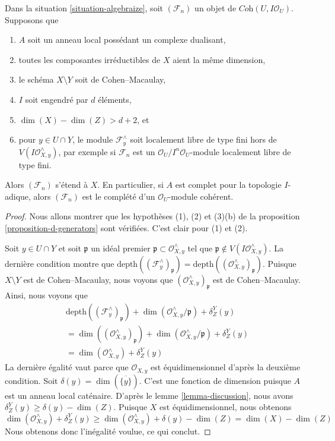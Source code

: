 \begin{lemma}
\label{lemma-interesting-case-final}
Dans la situation \ref{situation-algebraize}, soit $(\mathcal{F}_n)$
un objet de $\textit{Coh}(U, I\mathcal{O}_U)$. Supposons que
\begin{enumerate}
\item $A$ soit un anneau local possédant un complexe dualisant,
\item toutes les composantes irréductibles de $X$ aient la même dimension,
\item le schéma $X \setminus Y$ soit de Cohen--Macaulay,
\item $I$ soit engendré par $d$ éléments,
\item $\dim(X) - \dim(Z) > d + 2$, et
\item pour $y \in U \cap Y$, le module $\mathcal{F}_y^\wedge$
soit localement libre de type fini hors de $V(I\mathcal{O}_{X, y}^\wedge)$,
par exemple si $\mathcal{F}_n$ est un
$\mathcal{O}_U/I^n\mathcal{O}_U$-module localement libre de type fini.
\end{enumerate}
Alors $(\mathcal{F}_n)$ s'étend à $X$. En particulier, si $A$ est complet pour la topologie $I$-adique,
alors $(\mathcal{F}_n)$ est le complété d'un
$\mathcal{O}_U$-module cohérent.
\end{lemma}

\begin{proof}
Nous allons montrer que les hypothèses (1), (2) et (3)(b) de la
proposition \ref{proposition-d-generators} sont vérifiées.
C'est clair pour (1) et (2).

\medskip\noindent
Soit $y \in U \cap Y$ et soit $\mathfrak p$ un idéal premier
$\mathfrak p \subset \mathcal{O}_{X, y}^\wedge$ tel que
$\mathfrak p \not \in V(I\mathcal{O}_{X, y}^\wedge)$.
La dernière condition montre que
$\text{depth}((\mathcal{F}_y^\wedge)_\mathfrak p) =
\text{depth}((\mathcal{O}_{X, y}^\wedge)_\mathfrak p)$.
Puisque $X \setminus Y$ est de Cohen--Macaulay, nous voyons que
$(\mathcal{O}_{X, y}^\wedge)_\mathfrak p$ est de Cohen--Macaulay.
Ainsi, nous voyons que
\begin{align*}
& \text{depth}((\mathcal{F}^\wedge_y)_\mathfrak p) +
\dim(\mathcal{O}_{X, y}^\wedge/\mathfrak p) + \delta^Y_Z(y) \\
& =
\dim((\mathcal{O}_{X, y}^\wedge)_\mathfrak p) +
\dim(\mathcal{O}_{X, y}^\wedge/\mathfrak p) + \delta^Y_Z(y) \\
& =
\dim(\mathcal{O}_{X, y}^\wedge) + \delta^Y_Z(y)
\end{align*}
La dernière égalité vaut parce que $\mathcal{O}_{X, y}$ est équidimensionnel
d'après la deuxième condition.
Soit $\delta(y) = \dim(\overline{\{y\}})$. C'est une fonction de dimension
puisque $A$ est un anneau local caténaire.
D'après le lemme \ref{lemma-discussion},
nous avons $\delta^Y_Z(y) \geq \delta(y) - \dim(Z)$. Puisque $X$ est
équidimensionnel, nous obtenons
$$
\dim(\mathcal{O}_{X, y}^\wedge) + \delta^Y_Z(y)
\geq \dim(\mathcal{O}_{X, y}^\wedge) + \delta(y) - \dim(Z)
= \dim(X) - \dim(Z)
$$
Nous obtenons donc l'inégalité voulue, ce qui conclut.
\end{proof}

